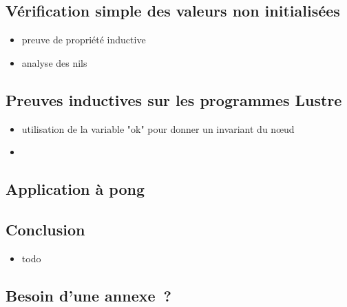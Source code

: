 \documentclass[11pt,usenames,dvipsnames]{beamer}
\begin{document}
\subsection{Vérification simple des valeurs non initialisées}
\begin{frame}{\null}
	\begin{itemize}
		\item preuve de propriété inductive
		\item analyse des nils
	\end{itemize}
\end{frame}


\subsection{Preuves inductives sur les programmes Lustre}
\begin{itemize}
\item utilisation de la variable "ok" pour donner un invariant du nœud
\item
\end{itemize}

\subsection{Application à pong}

\subsection{Conclusion}
\begin{frame}{\null}
  \begin{itemize}
  \item todo
  \end{itemize}
\end{frame}

\appendix
\subsection{Besoin d'une annexe ?}
\begin{frame}{\null}
\end{frame}
\end{document}
